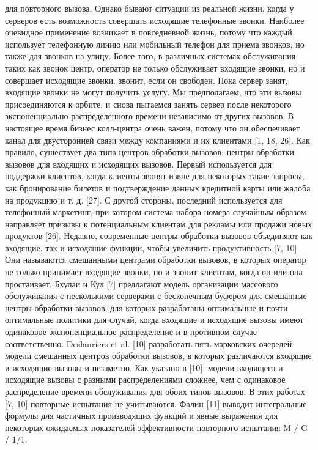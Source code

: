 для повторного вызова. Однако бывают ситуации из реальной жизни, когда у серверов есть
возможность совершать исходящие телефонные звонки. Наиболее очевидное применение возникает в повседневной
жизнь, потому что каждый использует телефонную линию или мобильный телефон для приема звонков, но
также для звонков на улицу. Более того, в различных системах обслуживания, таких как звонок
центр, оператор не только обслуживает входящие звонки, но и совершает исходящие звонки.
звонит, если он свободен. Пока сервер занят, входящие звонки не могут
получить услугу. Мы предполагаем, что эти вызовы присоединяются к орбите, и снова пытаемся занять
сервер после некоторого экспоненциально распределенного времени независимо от других вызовов.
В настоящее время бизнес колл-центра очень важен, потому что он обеспечивает канал
для двусторонней связи между компаниями и их клиентами [1, 18, 26].
Как правило, существует два типа центров обработки вызовов: центры обработки вызовов для входящих и исходящих вызовов.
Первый используется для поддержки клиентов, когда клиенты звонят извне для некоторых
такие запросы, как бронирование билетов и подтверждение данных кредитной карты
или жалоба на продукцию и т. д. [27]. С другой стороны, последний используется для
телефонный маркетинг, при котором система набора номера случайным образом направляет
призывы к потенциальным клиентам для рекламы или продажи новых продуктов [26]. Недавно,
современные центры обработки вызовов объединяют как входящие, так и исходящие функции, чтобы увеличить
продуктивность [7, 10]. Они называются смешанными центрами обработки вызовов, в которых оператор
не только принимает входящие звонки, но и звонит клиентам, когда он или
она простаивает.
Бхулаи и Кул [7] предлагают модель организации массового обслуживания с несколькими серверами с бесконечным буфером для
смешанные центры обработки вызовов, для которых разработаны оптимальные и почти оптимальные политики для
случай, когда входящие и исходящие вызовы имеют одинаковое экспоненциальное распределение
и в противном случае соответственно. Deslauriers et al. [10] разработать пять марковских очередей
модели смешанных центров обработки вызовов, в которых различаются входящие и исходящие вызовы
и незаметно. Как указано в [10], модели входящего и
исходящие вызовы с разными распределениями сложнее, чем с
одинаковое распределение времени обслуживания для обоих типов вызовов. В этих работах [7, 10]
повторные испытания не учитываются.
Фалин [11] выводит интегральные формулы для частичных производящих функций и явные выражения для некоторых ожидаемых показателей эффективности повторного испытания M / G / 1/1.
